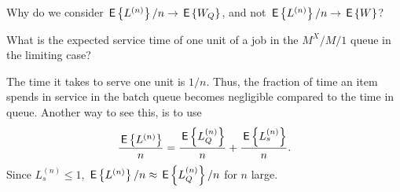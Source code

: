\begin{exercise}
  Why do we consider $\,\mathsf{E}\left\{L^{(n)}\right\}/n \to \,\mathsf{E}\left\{W_Q\right\}$, and not
  $\,\mathsf{E}\left\{L^{(n)}\right\}/n \to \,\mathsf{E}\left\{W\right\}$? 
  \begin{hint}
What is the expected service time of one
  unit of a job in the $M^X/M/1$ queue in the limiting case?
  \end{hint}
  \begin{solution}
    The time it takes to serve one unit is $1/n$. Thus, the fraction
    of time an item spends in service in the batch queue becomes negligible compared
    to the time in queue. Another way to see this, is to use 
    \begin{equation*}
      \frac{\,\mathsf{E}\left\{L^{(n)}\right\}}n = 
      \frac{\,\mathsf{E}\left\{L^{(n)}_Q\right\}}n + \frac{\,\mathsf{E}\left\{L^{(n)}_s\right\}}n.
    \end{equation*}
Since $L^{(n)}_s \leq 1$, $\,\mathsf{E}\left\{L^{(n)}\right\}/n \approx \,\mathsf{E}\left\{L^{(n)}_Q\right\}/n$ for $n$ large.
  \end{solution}
\end{exercise}

\begin{comment}
  
\begin{exercise}[use=false]
Can you model the $M^X/M/1$ as an $M/G/1$ queue, thereby deriving Eq.~(\ref{eq:43}) from Eq.~(\ref{eq:710})? 
  \begin{solution}
I guess this is a bit hard, so I include a partial answer for the interested. 


Starting from the $M/G/1$ queue, suppose first that the service time
$S$ is an exponential random variable with mean $1/\mu$.  Then the
$M/G/1$ reduces to the $M/M/1$ queue, which is evidentally equal to
the $M^1/M/1$ queue in which the jobs arrive as single units. Next, if
$S$ consists of the sum of $k$ i.i.d. exponential random variables
$S_i$ with mean $1/\mu$, i.e., $S=\sum_{i=1}^k S_i$, then the
$M^k/M/1$ queue results. Generalizing still further, we can take a
random batch $B$ of i.i.d. exponentials so that $S = \sum_{i=1}^B S_i$. Now
\begin{equation*}
  \P{S\leq x}
= \sum_{k=1}^\infty \P{S \leq x\given B=k}\P{B=k}
= \sum_{k=1}^\infty f(k) \P{\sum_{i=1}^B X_i \leq x}
\end{equation*}
where $f(k)=\P{B=k}$, and we obtain the $M^X/M/1$ from the $M/G/1$
queue by taking this distribution function for the service times.
  \end{solution}
\end{exercise}
\end{comment}

